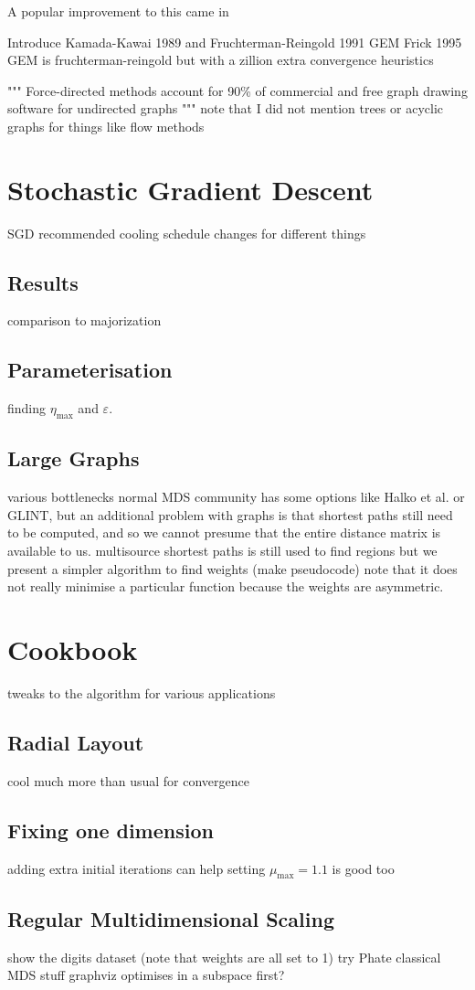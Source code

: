 A popular improvement to this came in 

Introduce Kamada-Kawai 1989 and Fruchterman-Reingold 1991 GEM Frick 1995
GEM is fruchterman-reingold but with a zillion extra convergence heuristics

"""
Force-directed methods account for 90\% of commercial and free graph drawing software for undirected graphs
"""
note that I did not mention trees or acyclic graphs for things like flow methods


\section{Stochastic Gradient Descent}
SGD
recommended cooling schedule changes for different things
\subsection{Results}
comparison to majorization
\subsection{Parameterisation}
finding $\eta_{\max}$ and $\varepsilon$.
\subsection{Large Graphs}
various bottlenecks
normal MDS community has some options like Halko et al. or GLINT, but an additional problem with graphs is that shortest paths still need to be computed, and so we cannot presume that the entire distance matrix is available to us.
multisource shortest paths is still used to find regions
but we present a simpler algorithm to find weights (make pseudocode)
note that it does not really minimise a particular function because the weights are asymmetric.

\section{Cookbook}
tweaks to the algorithm for various applications
\subsection{Radial Layout}
cool much more than usual for convergence
\subsection{Fixing one dimension}
adding extra initial iterations can help
setting $\mu_{\max}=1.1$ is good too
\subsection{Regular Multidimensional Scaling}
show the digits dataset (note that weights are all set to 1)
try Phate classical MDS stuff
graphviz optimises in a subspace first?